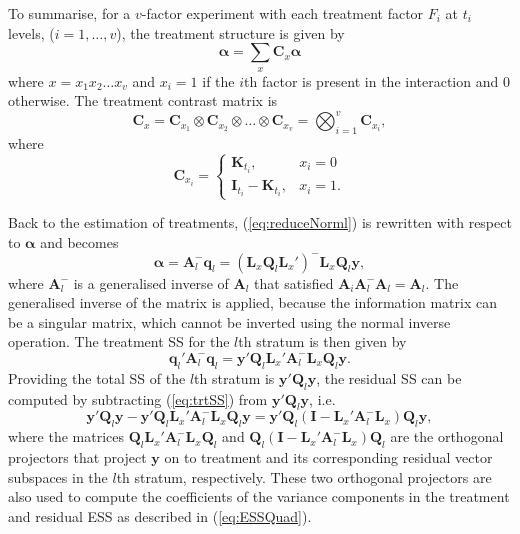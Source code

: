 \documentclass[article]{jss}
\newcommand{\I}{\mathbf{I}}
\newcommand{\K}{\mathbf{K}}
\newcommand{\Q}{\mathbf{Q}}
\newcommand{\A}{\mathbf{A}}
\newcommand{\C}{\mathbf{C}}
\newcommand{\mL}{\mathbf{L}}
\begin{document}
To summarise, for a $v$-factor experiment with each treatment factor $F_i$ at $t_i$ levels, ($i = 1, \dots, v$), the treatment structure is given by 
\begin{equation}
\bm{\alpha} = \sum_x{\C_x\bm{\alpha}}
\end{equation}
where $x = x_1 x_2 \dots x_{v}$ and $x_i = 1$ if the $i$th factor is present in the interaction and $0$ otherwise. The treatment contrast matrix is 
\[
\C_x =  \C_{x_1} \otimes  \C_{x_2} \otimes \dots \otimes  \C_{x_{v}} = \bigotimes^{v} _{i = 1} \C_{x_i},
\]
where  
\begin{equation}
\label{eq:contrMat}
 \C_{x_i} =  
   \begin{cases}
       \K_{t_i}, & x_i = 0 \\
       \I_{t_i} - \K_{t_i}, & x_i = 1.
    \end{cases}
\end{equation}
  
Back to the estimation of treatments, (\ref{eq:reduceNorml}) is rewritten with respect to $\bm{\alpha}$ and becomes
\begin{equation}
\label{eq:trtVec}
\bm{\alpha} = \A_{l}^{-} \bm{q}_l = (\mL_{x} \Q_l \mL_{x}')^{-} \mL_{x} \Q_l\bm{y},
\end{equation}
where $\A_{l}^{-}$ is a generalised inverse of $\A_{l}$ that satisfied $\A_{i} \A_{l}^{-} \A_{l} = \A_{l}$. The generalised inverse of the matrix is applied, because the information matrix can be a singular matrix, which cannot be inverted using the normal inverse operation. The treatment SS for the $l$th stratum is then given by
\begin{equation}
\label{eq:trtSS}
 \bm{q}_{l}' \A_{l}^{-} \bm{q}_{l} = \bm{y}'\Q_l \mL_{x}' \A_{l}^{-} \mL_{x} \Q_l\bm{y}.
\end{equation}
Providing the total SS of the $l$th stratum is $\bm{y}' \Q_l\bm{y}$, the residual SS can be computed by subtracting (\ref{eq:trtSS}) from $\bm{y}' \Q_l\bm{y}$, i.e.\ 
\begin{equation}
\label{eq:resSS}
\bm{y}' \Q_l\bm{y} - \bm{y}'\Q_l \mL_{x}' \A_{l}^{-} \mL_{x} \Q_l\bm{y} = \bm{y}'\Q_l ( \I - \mL_{x}' \A_{l}^{-} \mL_{x}) \Q_l\bm{y},
\end{equation}
where the matrices $\Q_l \mL_{x}' \A_{l}^{-} \mL_{x} \Q_l$ and $\Q_l ( \I - \mL_{x}' \A_{l}^{-} \mL_{x}) \Q_l$ are the orthogonal projectors that project $\bm{y}$ on to treatment and its corresponding residual vector subspaces in the $l$th stratum, respectively. These two orthogonal projectors are also used to compute the coefficients of the variance components in the treatment and residual ESS as described in (\ref{eq:ESSQuad}). 
\end{document}

